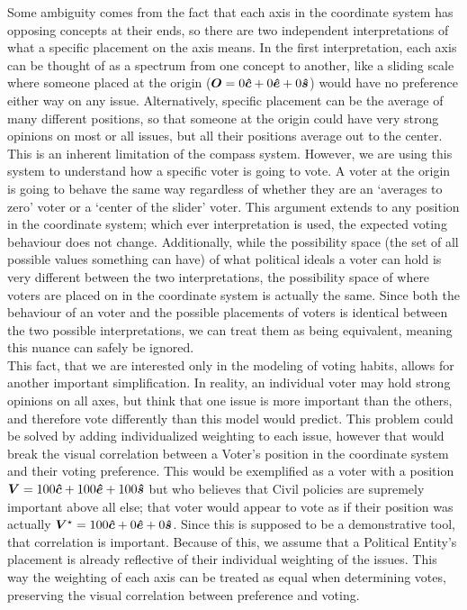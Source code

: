 \documentclass[12pt]{article}
\newcommand{\civ}{\vhat{c}}
\newcommand{\econ}{\vhat{e}}
\newcommand{\soc}{\vhat{s}}
\begin{document}
\qquad Some ambiguity comes from the fact that each axis in the coordinate system has opposing concepts at their ends, so there are two independent interpretations of what a specific placement on the axis means. In the first interpretation, each axis can be thought of as a spectrum from one concept to another, like a sliding scale where someone placed at the origin ($\bm{O} = 0\civ + 0\econ + 0\soc$) would have no preference either way on any issue. Alternatively, specific placement can be the average of many different positions, so that someone at the origin could have very strong opinions on most or all issues, but all their positions average out to the center. This is an inherent limitation of the compass system. However, we are using this system to understand how a specific voter is going to vote. A voter at the origin is going to behave the same way regardless of whether they are an `averages to zero' voter or a `center of the slider' voter. This argument extends to any position in the coordinate system; which ever interpretation is used, the expected voting behaviour does not change. Additionally, while the possibility space (the set of all possible values something can have) of what political ideals a voter can hold is very different between the two interpretations, the possibility space of where voters are placed on in the coordinate system is actually the same. Since both the behaviour of an voter and the possible placements of voters is identical between the two possible interpretations, we can treat them as being equivalent, meaning this nuance can safely be ignored. \\

\qquad This fact, that we are interested only in the modeling of voting habits, allows for another important simplification. In reality, an individual voter may hold strong opinions on all axes, but think that one issue is more important than the others, and therefore vote differently than this model would predict. This problem could be solved by adding individualized weighting to each issue, however that would break the visual correlation between a Voter's position in the coordinate system and their voting preference. This would be exemplified as a voter with a position $\bm{V} = 100\civ + 100\econ + 100\soc$ but who believes that Civil policies are supremely important above all else; that voter would appear to vote as if their position was actually $\bm{V}^\star = 100\civ + 0\econ + 0\soc$. Since this is supposed to be a demonstrative tool, that correlation is important. Because of this, we assume that a Political Entity's placement is already reflective of their individual weighting of the issues. This way the weighting of each axis can be treated as equal when determining votes, preserving the visual correlation between preference and voting. \\
\end{document}

